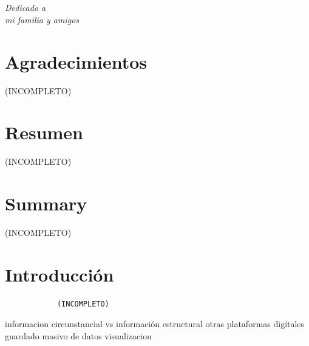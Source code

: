 \documentclass[a4paper, 12pt]{book}
\begin{document}
	\chapter*{}
	\begin{flushright}
		\textit{Dedicado a \\
			mi familia y amigos}
	\end{flushright}
	
	
	\chapter*{Agradecimientos}
	
		(INCOMPLETO)
		
	\chapter*{Resumen}
	
		(INCOMPLETO)
		
	\chapter*{Summary}
	
		(INCOMPLETO)
	
	
	\tableofcontents 
	\cleardoublepage
	\listoffigures %
	
	\cleardoublepage
	\chapter{Introducción}
	\label{chap:introduccion} 
		{\footnotesize
			\begin{verbatim}
			(INCOMPLETO)	
			\end{verbatim}
		}
		informacion circunstancial vs información estructural
		otras plataformas digitales
			guardado masivo de datos
			visualizacion
	
\end{document}
